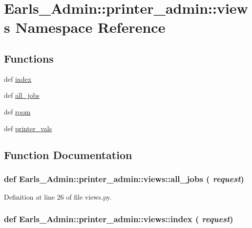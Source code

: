 \hypertarget{namespaceEarls__Admin_1_1printer__admin_1_1views}{
\section{Earls\_\-Admin::printer\_\-admin::views Namespace Reference}
\label{namespaceEarls__Admin_1_1printer__admin_1_1views}
}


\subsection*{Functions}
\begin{CompactItemize}
\item 
def \hyperlink{namespaceEarls__Admin_1_1printer__admin_1_1views_07e587730078f56ff61d313951326490}{index}
\item 
def \hyperlink{namespaceEarls__Admin_1_1printer__admin_1_1views_3697cc7114c23e9c5ea4f708f8da4d25}{all\_\-jobs}
\item 
def \hyperlink{namespaceEarls__Admin_1_1printer__admin_1_1views_99bfbb487e555b869a6c3154f558a5ac}{room}
\item 
def \hyperlink{namespaceEarls__Admin_1_1printer__admin_1_1views_ddc42c5551d82f75bf3699381797c267}{printer\_\-vals}
\end{CompactItemize}


\subsection{Function Documentation}
\hypertarget{namespaceEarls__Admin_1_1printer__admin_1_1views_3697cc7114c23e9c5ea4f708f8da4d25}{
\subsubsection[all\_\-jobs]{\setlength{\rightskip}{0pt plus 5cm}def Earls\_\-Admin::printer\_\-admin::views::all\_\-jobs ( {\em request})}}
\label{namespaceEarls__Admin_1_1printer__admin_1_1views_3697cc7114c23e9c5ea4f708f8da4d25}




Definition at line 26 of file views.py.\hypertarget{namespaceEarls__Admin_1_1printer__admin_1_1views_07e587730078f56ff61d313951326490}{
\subsubsection[index]{\setlength{\rightskip}{0pt plus 5cm}def Earls\_\-Admin::printer\_\-admin::views::index ( {\em request})}}
\label{namespaceEarls__Admin_1_1printer__admin_1_1views_07e587730078f56ff61d313951326490}




